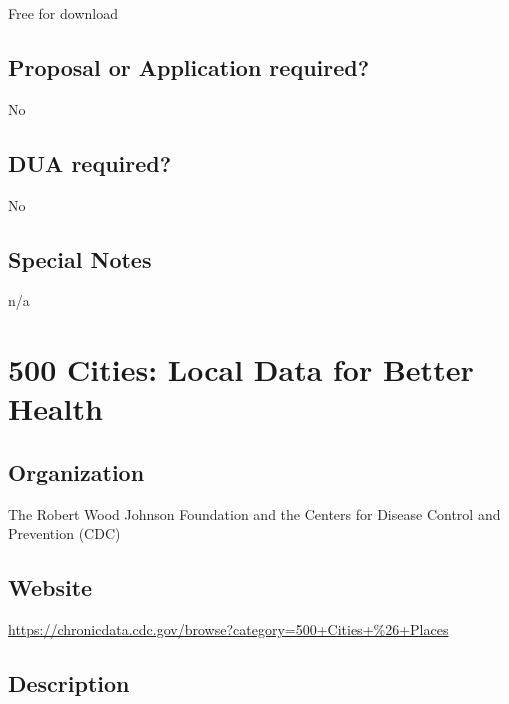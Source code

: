 \documentclass[
]{book}
\begin{document}
Free for download

\hypertarget{proposal-or-application-required-97}{%
\section{Proposal or Application required?}\label{proposal-or-application-required-97}}

No

\hypertarget{dua-required-97}{%
\section{DUA required?}\label{dua-required-97}}

No

\hypertarget{special-notes-97}{%
\section{Special Notes}\label{special-notes-97}}

n/a

\mainmatter

\hypertarget{cities-local-data-for-better-health}{%
\chapter{500 Cities: Local Data for Better Health}\label{cities-local-data-for-better-health}}

\hypertarget{organization-98}{%
\section{Organization}\label{organization-98}}

The Robert Wood Johnson Foundation and the Centers for Disease Control and Prevention (CDC)

\hypertarget{website-98}{%
\section{Website}\label{website-98}}

\url{https://chronicdata.cdc.gov/browse?category=500+Cities+\%26+Places}

\hypertarget{description-98}{%
\section{Description}\label{description-98}}
\end{document}
